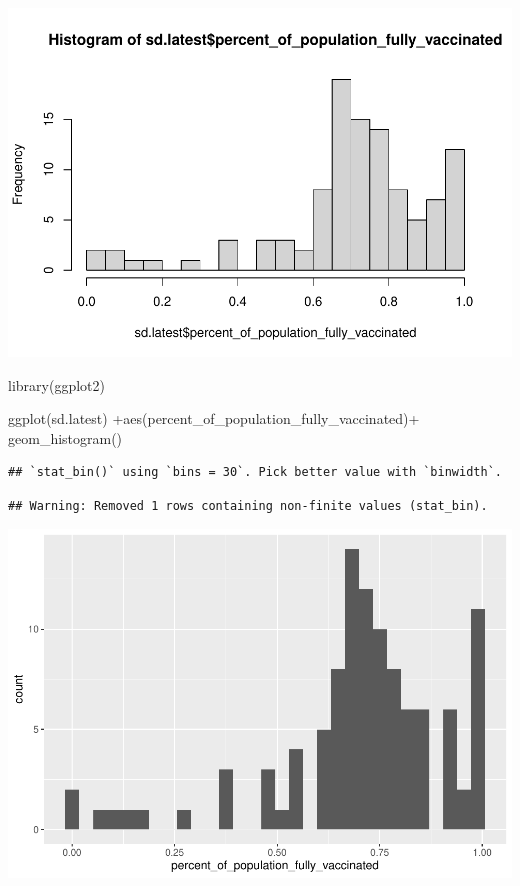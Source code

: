 \documentclass[
]{article}
\newenvironment{Shaded}{\begin{snugshade}}{\end{snugshade}}
\newcommand{\FunctionTok}[1]{\textcolor[rgb]{0.00,0.00,0.00}{#1}}
\newcommand{\NormalTok}[1]{#1}
\newcommand{\SpecialCharTok}[1]{\textcolor[rgb]{0.00,0.00,0.00}{#1}}
\begin{document}
\includegraphics{COVID-19-Vax-mini-project_files/figure-latex/unnamed-chunk-26-1.pdf}

\begin{Shaded}
\begin{Highlighting}[]
\FunctionTok{library}\NormalTok{(ggplot2)}

\FunctionTok{ggplot}\NormalTok{(sd.latest) }\SpecialCharTok{+}\FunctionTok{aes}\NormalTok{(percent\_of\_population\_fully\_vaccinated)}\SpecialCharTok{+} \FunctionTok{geom\_histogram}\NormalTok{()}
\end{Highlighting}
\end{Shaded}

\begin{verbatim}
## `stat_bin()` using `bins = 30`. Pick better value with `binwidth`.
\end{verbatim}

\begin{verbatim}
## Warning: Removed 1 rows containing non-finite values (stat_bin).
\end{verbatim}

\includegraphics{COVID-19-Vax-mini-project_files/figure-latex/unnamed-chunk-27-1.pdf}
\end{document}
